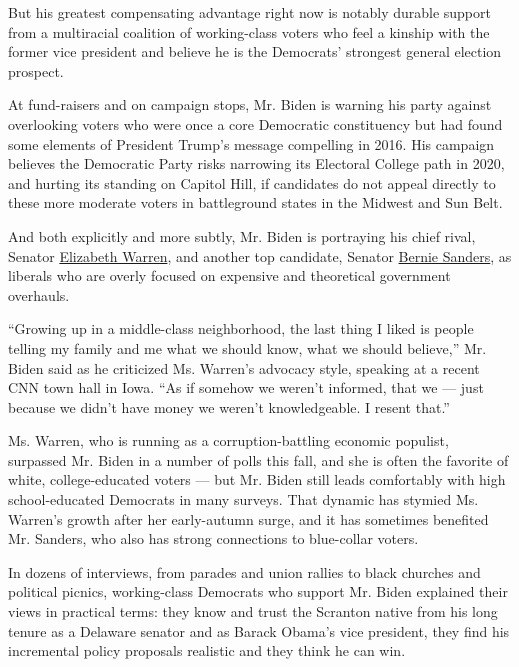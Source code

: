 But his greatest compensating advantage right now is notably durable
support from a multiracial coalition of working-class voters who feel a
kinship with the former vice president and believe he is the Democrats'
strongest general election prospect.

At fund-raisers and on campaign stops, Mr. Biden is warning his party
against overlooking voters who were once a core Democratic constituency
but had found some elements of President Trump's message compelling in
2016. His campaign believes the Democratic Party risks narrowing its
Electoral College path in 2020, and hurting its standing on Capitol
Hill, if candidates do not appeal directly to these more moderate voters
in battleground states in the Midwest and Sun Belt.

And both explicitly and more subtly, Mr. Biden is portraying his chief
rival, Senator
\href{https://www.nytimes.com/interactive/2020/us/elections/elizabeth-warren.html}{Elizabeth
Warren}, and another top candidate, Senator
\href{https://www.nytimes.com/interactive/2020/us/elections/bernie-sanders.html}{Bernie
Sanders}, as liberals who are overly focused on expensive and
theoretical government overhauls.

``Growing up in a middle-class neighborhood, the last thing I liked is
people telling my family and me what we should know, what we should
believe,'' Mr. Biden said as he criticized Ms. Warren's advocacy style,
speaking at a recent CNN town hall in Iowa. ``As if somehow we weren't
informed, that we --- just because we didn't have money we weren't
knowledgeable. I resent that.''

Ms. Warren, who is running as a corruption-battling economic populist,
surpassed Mr. Biden in a number of polls this fall, and she is often the
favorite of white, college-educated voters --- but Mr. Biden still leads
comfortably with high school-educated Democrats in many surveys. That
dynamic has stymied Ms. Warren's growth after her early-autumn surge,
and it has sometimes benefited Mr. Sanders, who also has strong
connections to blue-collar voters.

In dozens of interviews, from parades and union rallies to black
churches and political picnics, working-class Democrats who support Mr.
Biden explained their views in practical terms: they know and trust the
Scranton native from his long tenure as a Delaware senator and as Barack
Obama's vice president, they find his incremental policy proposals
realistic and they think he can win.

